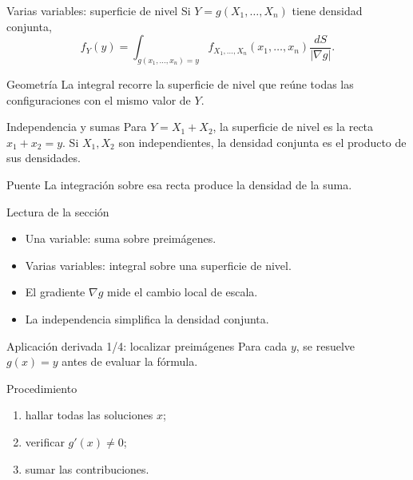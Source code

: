 \documentclass[10pt,aspectratio=169]{beamer}
\begin{document}
\begin{frame}{Varias variables: superficie de nivel}
  \footnotesize
  Si $Y=g(X_1,\ldots,X_n)$ tiene densidad conjunta,
  \[
    f_Y(y)=\int_{g(x_1,\ldots,x_n)=y}
    f_{X_1,\ldots,X_n}(x_1,\ldots,x_n)\frac{dS}{|\nabla g|}.
  \]
  \begin{block}{Geometría}
    La integral recorre la superficie de nivel que reúne todas las
    configuraciones con el mismo valor de $Y$.
  \end{block}
\end{frame}

\begin{frame}{Independencia y sumas}
  \footnotesize
  Para $Y=X_1+X_2$, la superficie de nivel es la recta
  $x_1+x_2=y$. Si $X_1,X_2$ son independientes, la densidad conjunta es el
  producto de sus densidades.
  \begin{alertblock}{Puente}
    La integración sobre esa recta produce la densidad de la suma.
  \end{alertblock}
\end{frame}

\begin{frame}{Lectura de la sección}
  \footnotesize
  \begin{itemize}\itemsep=0.12cm
    \item Una variable: suma sobre preimágenes.
    \item Varias variables: integral sobre una superficie de nivel.
    \item El gradiente $\nabla g$ mide el cambio local de escala.
    \item La independencia simplifica la densidad conjunta.
  \end{itemize}
\end{frame}

\begin{frame}{Aplicación derivada 1/4: localizar preimágenes}
  \footnotesize
  Para cada $y$, se resuelve $g(x)=y$ antes de evaluar la fórmula.
  \begin{block}{Procedimiento}
    \begin{enumerate}\itemsep=0.1cm
      \item hallar todas las soluciones $x$;
      \item verificar $g'(x)\neq0$;
      \item sumar las contribuciones.
    \end{enumerate}
  \end{block}
\end{frame}
\end{document}
